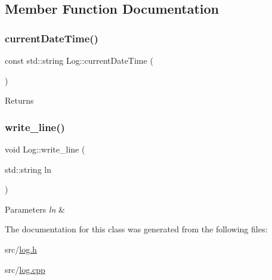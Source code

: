 \subsection{Member Function Documentation}
\mbox{\label{class_log_af056ba4ff9151d69bf1b302a95253c52}} 
\subsubsection{\texorpdfstring{current\+Date\+Time()}{currentDateTime()}}
{\footnotesize\ttfamily const std\+::string Log\+::current\+Date\+Time (\begin{DoxyParamCaption}{ }\end{DoxyParamCaption})}

\begin{DoxyReturn}{Returns}

\end{DoxyReturn}
\mbox{\label{class_log_aeb1d174708785f8f763895ad8e41d580}} 
\subsubsection{\texorpdfstring{write\+\_\+line()}{write\_line()}}
{\footnotesize\ttfamily void Log\+::write\+\_\+line (\begin{DoxyParamCaption}\item[{std\+::string}]{ln }\end{DoxyParamCaption})}


\begin{DoxyParams}{Parameters}
{\em ln} & \\
\hline
\end{DoxyParams}


The documentation for this class was generated from the following files\+:\begin{DoxyCompactItemize}
\item 
src/\mbox{\hyperlink{log_8h}{log.\+h}}\item 
src/\mbox{\hyperlink{log_8cpp}{log.\+cpp}}\end{DoxyCompactItemize}
